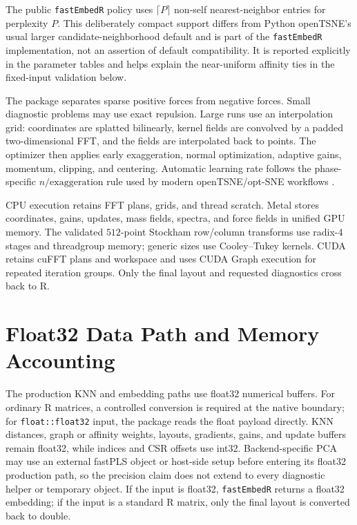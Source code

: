 \documentclass[twoside,11pt]{article}
\newcommand{\pkg}{\texttt{fastEmbedR}}
\begin{document}
The public \pkg{} policy uses \(\lceil P\rceil\) non-self nearest-neighbor entries for
perplexity \(P\). This deliberately compact support differs from Python
openTSNE's usual larger candidate-neighborhood default and is part of the
\pkg{} implementation, not an assertion of default compatibility. It is
reported explicitly in the parameter tables and helps explain the
near-uniform affinity ties in the fixed-input validation below.

The package separates sparse positive forces from negative forces. Small diagnostic problems may use exact repulsion. Large runs use an interpolation grid: coordinates are splatted bilinearly, kernel fields are convolved by a padded two-dimensional FFT, and the fields are interpolated back to points. The optimizer then applies early exaggeration, normal optimization, adaptive gains, momentum, clipping, and centering. Automatic learning rate follows the phase-specific $n/\mathrm{exaggeration}$ rule used by modern openTSNE/opt-SNE workflows \citep{policar2024,belkina2019}.

CPU execution retains FFT plans, grids, and thread scratch. Metal stores coordinates, gains, updates, mass fields, spectra, and force fields in unified GPU memory. The validated $512$-point Stockham row/column transforms use radix-4 stages and threadgroup memory; generic sizes use Cooley--Tukey kernels. CUDA retains cuFFT plans and workspace and uses CUDA Graph execution for repeated iteration groups. Only the final layout and requested diagnostics cross back to R.

\section{Float32 Data Path and Memory Accounting}

The production KNN and embedding paths use float32 numerical buffers. For ordinary R matrices, a controlled conversion is required at the native boundary; for \texttt{float::float32} input, the package reads the float payload directly. KNN distances, graph or affinity weights, layouts, gradients, gains, and update buffers remain float32, while indices and CSR offsets use int32. Backend-specific PCA may use an external fastPLS object or host-side setup before entering its float32 production path, so the precision claim does not extend to every diagnostic helper or temporary object. If the input is float32, \pkg{} returns a float32 embedding; if the input is a standard R matrix, only the final layout is converted back to double.
\end{document}
